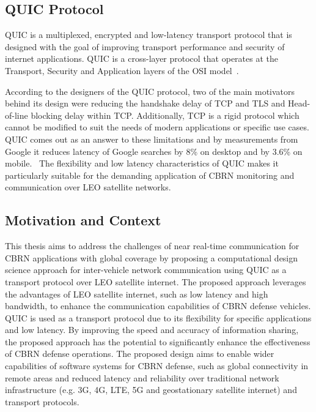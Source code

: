 \subsection{QUIC Protocol}
QUIC is a multiplexed, encrypted and low-latency transport protocol that is designed with the goal of improving transport performance and security of internet applications. QUIC is a cross-layer protocol that operates at the Transport, Security and Application layers of the OSI model~\citep{LangleyAdam2017TQTP}.
\par
According to the designers of the QUIC protocol, two of the main motivators behind its design were reducing the handshake delay of TCP and TLS and Head-of-line blocking delay within TCP. Additionally, TCP is a rigid protocol which cannot be modified to suit the needs of modern applications or specific use cases. QUIC comes out as an answer to these limitations and by measurements from Google it reduces latency of Google searches by 8\% on desktop and by 3.6\% on mobile.~\citep{LangleyAdam2017TQTP} The flexibility and low latency characteristics of QUIC makes it particularly suitable for the demanding application of CBRN monitoring and communication over LEO satellite networks.
\subsection{Motivation and Context}
 This thesis aims to address the challenges of near real-time communication for CBRN applications with global coverage by proposing a computational design science approach for inter-vehicle network communication using QUIC as a transport protocol over LEO satellite internet. The proposed approach leverages the advantages of LEO satellite internet, such as low latency and high bandwidth, to enhance the communication capabilities of CBRN defense vehicles. QUIC is used as a transport protocol due to its flexibility for specific applications and low latency. By improving the speed and accuracy of information sharing, the proposed approach has the potential to significantly enhance the effectiveness of CBRN defense operations. The proposed design aims to enable wider capabilities of software systems for CBRN defense, such as global connectivity in remote areas and reduced latency and reliability over traditional network infrastructure (e.g. 3G, 4G, LTE, 5G and geostationary satellite internet) and transport protocols.

